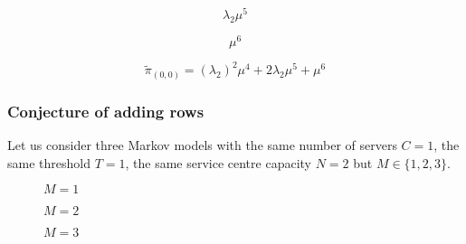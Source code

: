 \begin{multicols}{4}
    \begin{figure}[H]
        \centering
        \scalebox{0.6}{
            }
    \end{figure}
    \vspace*{\fill}
    \columnbreak
    \vspace*{0.3cm}
    \begin{equation*}
        \lambda_2 \mu^5
    \end{equation*}
    \vspace*{\fill}
    \columnbreak
    \begin{figure}[H]
        \centering
        \scalebox{0.6}{
            }
    \end{figure}
    \vspace*{\fill}
    \columnbreak
    \vspace*{0.3cm}
    \begin{equation*}
        \mu^6
    \end{equation*}
\end{multicols}


\begin{equation*}
    \tilde{\pi}_{(0,0)} = (\lambda_2)^2 \mu^4 + 2 \lambda_2 \mu^5 + \mu^6
\end{equation*}

\newpage
\subsubsection{Conjecture of adding rows}

Let us consider three Markov models with the same number of servers \(C=1\), 
the same threshold \(T=1\), the same service centre capacity \(N=2\) but 
\(M\in\{1, 2, 3\}\).


\begin{multicols}{3}
    \begin{figure}[H]
        \centering
        \scalebox{0.8}{
            }
        \caption{\(M=1\)}
    \end{figure}
    \columnbreak
    \begin{figure}[H]
        \centering
        \scalebox{0.8}{
            }
        \caption{\(M=2\)}
    \end{figure}
    \begin{figure}[H]
        \centering
        \scalebox{0.8}{
            }
        \caption{\(M=3\)}
    \end{figure}
\end{multicols}


